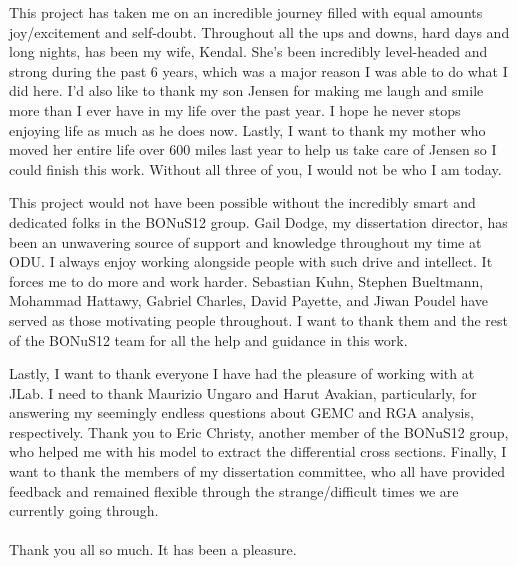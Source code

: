 \null
\vfill
\begin{center}
\end{center}
\vfill


This project has taken me on an incredible journey filled with equal amounts joy/excitement and self-doubt. Throughout all the ups and downs, hard days and long nights, has been my wife, Kendal. She's been incredibly level-headed and strong during the past 6 years, which was a major reason I was able to do what I did here. I'd also like to thank my son Jensen for making me laugh and smile more than I ever have in my life over the past year. I hope he never stops enjoying life as much as he does now. Lastly, I want to thank my mother who moved her entire life over 600 miles last year to help us take care of Jensen so I could finish this work. Without all three of you, I would not be who I am today.

This project would not have been possible without the incredibly smart and dedicated folks in the BONuS12 group. Gail Dodge, my dissertation director, has been an unwavering source of support and knowledge throughout my time at ODU. I always enjoy working alongside people with such drive and intellect. It forces me to do more and work harder. Sebastian Kuhn, Stephen Bueltmann, Mohammad Hattawy, Gabriel Charles, David Payette, and Jiwan Poudel have served as those motivating people throughout. I want to thank them and the rest of the BONuS12 team for all the help and guidance in this work.

Lastly, I want to thank everyone I have had the pleasure of working with at JLab. I need to thank Maurizio Ungaro and Harut Avakian, particularly, for answering my seemingly endless questions about GEMC and RGA analysis, respectively. Thank you to Eric Christy, another member of the BONuS12 group, who helped me with his model to extract the differential cross sections. Finally, I want to thank the members of my dissertation committee, who all have provided feedback and remained flexible through the strange/difficult times we are currently going through. \\ \\
\noindent
Thank you all so much. It has been a pleasure.


